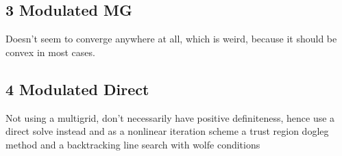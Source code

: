 \documentclass[a4paper, 11pt]{article}
\begin{document}
\subsection*{3 Modulated MG}
Doesn't seem to converge anywhere at all, which is weird, because it should be convex in most cases.

\subsection*{4 Modulated Direct}
Not using a multigrid, don't necessarily have positive definiteness, hence use a direct solve instead and as a nonlinear iteration scheme a trust region dogleg method and a backtracking line search with wolfe conditions
\end{document}
